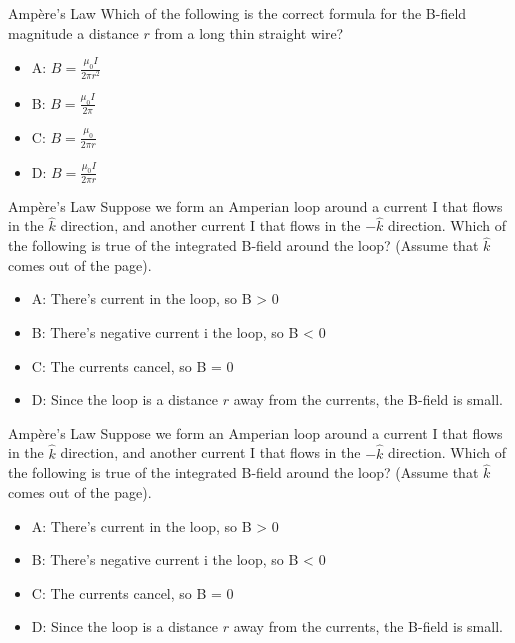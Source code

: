 \documentclass{beamer}
\begin{document}
\begin{frame}{Amp\`{e}re's Law}
Which of the following is the correct formula for the B-field magnitude a distance $r$ from a long thin straight wire?
\begin{itemize}
\item A: $B = \frac{\mu_0 I}{2\pi r^2}$
\item B: $B = \frac{\mu_0 I}{2\pi}$
\item C: $B = \frac{\mu_0}{2\pi r}$
\item D: $B = \frac{\mu_0 I}{2\pi r}$
\end{itemize}
\end{frame}

\begin{frame}{Amp\`{e}re's Law}
Suppose we form an Amperian loop around a current I that flows in the $\hat{k}$ direction, and another current I that flows in the $-\hat{k}$ direction.  Which of the following is true of the integrated B-field around the loop? (Assume that $\hat{k}$ comes out of the page).
\begin{itemize}
\item A: There's current in the loop, so B > 0
\item B: There's negative current i the loop, so B < 0
\item C: The currents cancel, so B = 0
\item D: Since the loop is a distance $r$ away from the currents, the B-field is small.
\end{itemize}
\end{frame}

\begin{frame}{Amp\`{e}re's Law}
Suppose we form an Amperian loop around a current I that flows in the $\hat{k}$ direction, and another current I that flows in the $-\hat{k}$ direction.  Which of the following is true of the integrated B-field around the loop? (Assume that $\hat{k}$ comes out of the page).
\begin{itemize}
\item A: There's current in the loop, so B > 0
\item B: There's negative current i the loop, so B < 0
\item C: The currents cancel, so B = 0
\item D: Since the loop is a distance $r$ away from the currents, the B-field is small.
\end{itemize}
\end{frame}
\end{document}

